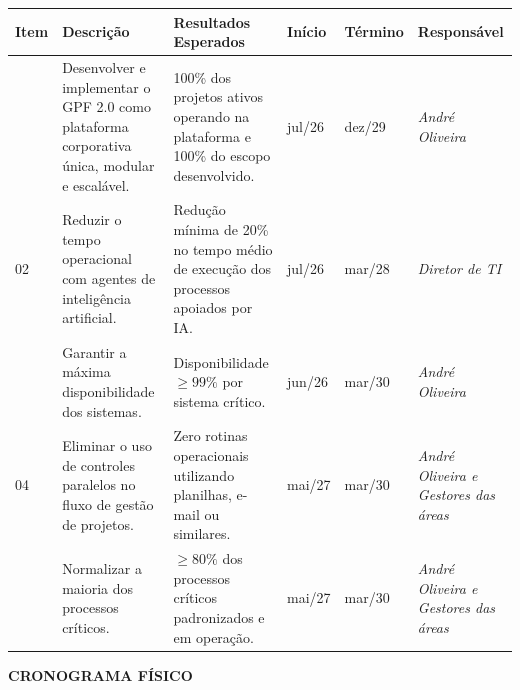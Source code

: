 \documentclass[12pt,a4paper]{article}
\newcommand{\secao}[1]{%
  \par\vspace{6pt}%
  {\noindent\bfseries\color{azulTitulo}\fontsize{13}{16}\selectfont #1}%
  \par\vspace{2pt}%
}
\begin{document}
\begingroup
\footnotesize
{}
\renewcommand{\arraystretch}{1.3}
\setlength{\tabcolsep}{4pt}
\begin{tabular}{|>{\centering\arraybackslash}p{}|p{}|p{}|>{\centering\arraybackslash}p{}|>{\centering\arraybackslash}p{}|>{\centering\arraybackslash}p{}|}
\hline
\cellcolor{azulCabecalho}\bfseries Item &
\cellcolor{azulCabecalho}\centering\arraybackslash\bfseries Descrição &
\cellcolor{azulCabecalho}\centering\arraybackslash\bfseries Resultados Esperados &
\cellcolor{azulCabecalho}\bfseries Início &
\cellcolor{azulCabecalho}\bfseries Término &
\cellcolor{azulCabecalho}\bfseries Responsável \\
\hline
01 & Desenvolver e implementar o GPF 2.0 como plataforma corporativa única, modular e escalável. & 100\% dos projetos ativos operando na plataforma e 100\% do escopo desenvolvido. & jul/26 & dez/29 & \itshape André Oliveira \\
\hline
\cellcolor{cinzaClaro}02 & \cellcolor{cinzaClaro}Reduzir o tempo operacional com agentes de inteligência artificial. & \cellcolor{cinzaClaro}Redução mínima de 20\% no tempo médio de execução dos processos apoiados por IA. & \cellcolor{cinzaClaro}jul/26 & \cellcolor{cinzaClaro}mar/28 & \cellcolor{cinzaClaro}\itshape Diretor de TI \\
\hline
03 & Garantir a máxima disponibilidade dos sistemas. & Disponibilidade $\geq 99\%$ por sistema crítico. & jun/26 & mar/30 & \itshape André Oliveira \\
\hline
\cellcolor{cinzaClaro}04 & \cellcolor{cinzaClaro}Eliminar o uso de controles paralelos no fluxo de gestão de projetos. & \cellcolor{cinzaClaro}Zero rotinas operacionais utilizando planilhas, e-mail ou similares. & \cellcolor{cinzaClaro}mai/27 & \cellcolor{cinzaClaro}mar/30 & \cellcolor{cinzaClaro}\itshape André Oliveira e Gestores das áreas \\
\hline
05 & Normalizar a maioria dos processos críticos. & $\geq 80\%$ dos processos críticos padronizados e em operação. & mai/27 & mar/30 & \itshape André Oliveira e Gestores das áreas \\
\hline
\end{tabular}
\endgroup

\secao{CRONOGRAMA FÍSICO}
\end{document}
